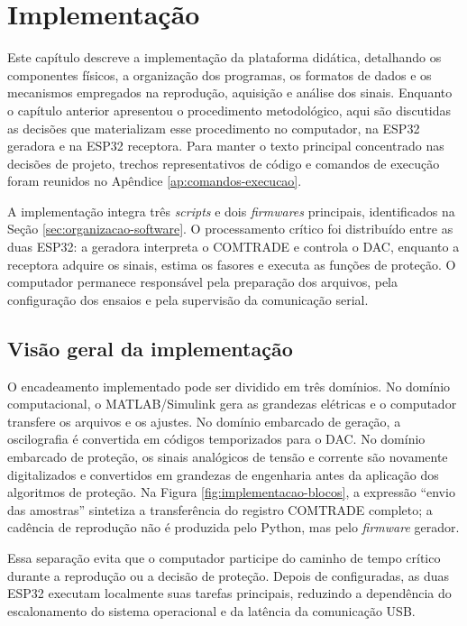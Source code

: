 \chapter{Implementação}

Este capítulo descreve a implementação da plataforma didática, detalhando os componentes físicos, a organização dos programas, os formatos de dados e os mecanismos empregados na reprodução, aquisição e análise dos sinais. Enquanto o capítulo anterior apresentou o procedimento metodológico, aqui são discutidas as decisões que materializam esse procedimento no computador, na ESP32 geradora e na ESP32 receptora. Para manter o texto principal concentrado nas decisões de projeto, trechos representativos de código e comandos de execução foram reunidos no Apêndice \ref{ap:comandos-execucao}.

A implementação integra três \textit{scripts} e dois \textit{firmwares} principais, identificados na Seção \ref{sec:organizacao-software}. O processamento crítico foi distribuído entre as duas ESP32: a geradora interpreta o COMTRADE e controla o DAC, enquanto a receptora adquire os sinais, estima os fasores e executa as funções de proteção. O computador permanece responsável pela preparação dos arquivos, pela configuração dos ensaios e pela supervisão da comunicação serial.

\section{Visão geral da implementação}

O encadeamento implementado pode ser dividido em três domínios. No domínio computacional, o MATLAB/Simulink gera as grandezas elétricas e o computador transfere os arquivos e os ajustes. No domínio embarcado de geração, a oscilografia é convertida em códigos temporizados para o DAC. No domínio embarcado de proteção, os sinais analógicos de tensão e corrente são novamente digitalizados e convertidos em grandezas de engenharia antes da aplicação dos algoritmos de proteção. Na Figura \ref{fig:implementacao-blocos}, a expressão ``envio das amostras'' sintetiza a transferência do registro COMTRADE completo; a cadência de reprodução não é produzida pelo Python, mas pelo \textit{firmware} gerador.

Essa separação evita que o computador participe do caminho de tempo crítico durante a reprodução ou a decisão de proteção. Depois de configuradas, as duas ESP32 executam localmente suas tarefas principais, reduzindo a dependência do escalonamento do sistema operacional e da latência da comunicação USB.

